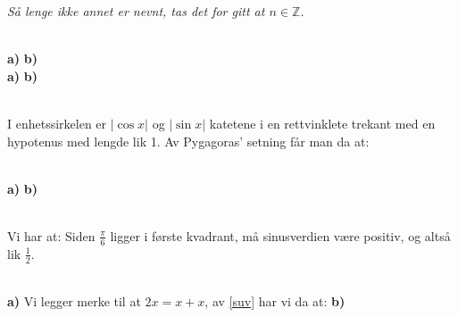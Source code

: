 

\usepackage{xr}



\textit{Så lenge ikke annet er nevnt, tas det for gitt at $ n\in \mathbb{Z} $.} \vsk

\\
\textbf{a)}
\textbf{b)}
\\
\textbf{a)}
\textbf{b)}

\\
I enhetssirkelen er $ |\cos x| $ og $ |\sin x| $ katetene i en rettvinklete trekant med en hypotenus med lengde lik 1. Av Pygagoras' setning får man da at:

\\
\textbf{a)} 
\newpage
\textbf{b)} 

\\
Vi har at:
Siden $ \frac{\pi}{6} $ ligger i første kvadrant, må sinusverdien være positiv, og altså lik $ \frac{1}{2} $.\vsk

\\
\textbf{a)} Vi legger merke til at $ {2x=x+x} $, av \eqref{suv} har vi da at:
\textbf{b)} 

